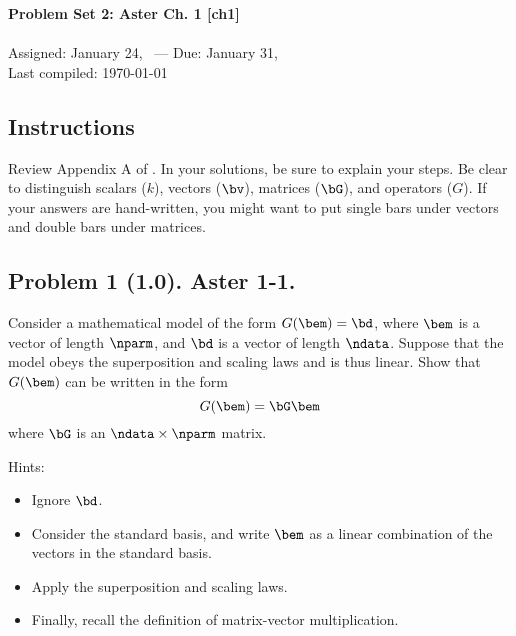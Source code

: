 \documentclass[11pt,titlepage,fleqn]{article}
\begin{document}

\begin{spacing}{1.2}
\centering
{\large \bf Problem Set 2: Aster Ch. 1 [ch1]} \\
\cltag\ \\
Assigned: January 24, \cyear\ --- Due: January 31, \cyear\ \\
Last compiled: \today
\end{spacing}


\subsection*{Instructions}

Review Appendix A of \citet{Aster}. In your solutions, be sure to explain your steps. Be clear to distinguish scalars ($k$), vectors ($\bv$), matrices ($\bG$), and operators ($G$). If your answers are hand-written, you might want to put single bars under vectors and double bars under matrices.

\subsection*{Problem 1 (1.0). Aster 1-1.}

Consider a mathematical model of the form $G(\bem) = \bd$, where $\bem$ is a vector of length $\nparm$, and $\bd$ is a vector of length $\ndata$. Suppose that the model obeys the superposition and scaling laws and is thus linear. Show that $G(\bem)$ can be written in the form
%
\begin{equation}
G(\bem) = \bG\bem
\end{equation}
%
where $\bG$ is an $\ndata \times \nparm$ matrix.

\medskip\noindent
Hints:
%
\begin{itemize}
\item Ignore $\bd$.
\item Consider the standard basis, and write $\bem$ as a linear combination of the vectors in the standard basis.
\item Apply the superposition and scaling laws.
\item Finally, recall the definition of matrix-vector multiplication.
\end{itemize}

\end{document}
